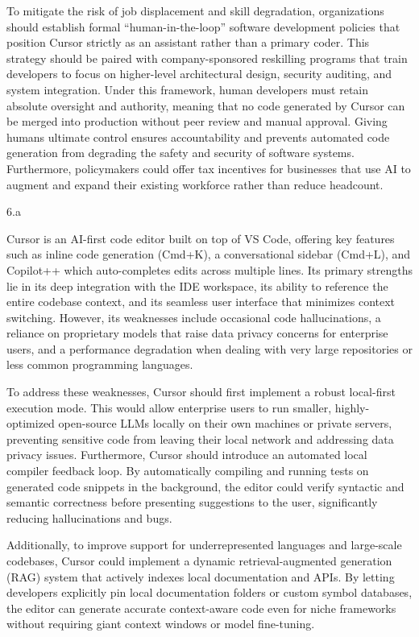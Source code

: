 \begin{answer}
  To mitigate the risk of job displacement and skill degradation, organizations should establish formal ``human-in-the-loop'' software development policies that position Cursor strictly as an assistant rather than a primary coder. This strategy should be paired with company-sponsored reskilling programs that train developers to focus on higher-level architectural design, security auditing, and system integration. Under this framework, human developers must retain absolute oversight and authority, meaning that no code generated by Cursor can be merged into production without peer review and manual approval. Giving humans ultimate control ensures accountability and prevents automated code generation from degrading the safety and security of software systems. Furthermore, policymakers could offer tax incentives for businesses that use AI to augment and expand their existing workforce rather than reduce headcount.
\end{answer}
\clearpage

\LARGE
6.a
\normalsize

\begin{answer}
  Cursor is an AI-first code editor built on top of VS Code, offering key features such as inline code generation (Cmd+K), a conversational sidebar (Cmd+L), and Copilot++ which auto-completes edits across multiple lines. Its primary strengths lie in its deep integration with the IDE workspace, its ability to reference the entire codebase context, and its seamless user interface that minimizes context switching. However, its weaknesses include occasional code hallucinations, a reliance on proprietary models that raise data privacy concerns for enterprise users, and a performance degradation when dealing with very large repositories or less common programming languages.

  To address these weaknesses, Cursor should first implement a robust local-first execution mode. This would allow enterprise users to run smaller, highly-optimized open-source LLMs locally on their own machines or private servers, preventing sensitive code from leaving their local network and addressing data privacy issues. Furthermore, Cursor should introduce an automated local compiler feedback loop. By automatically compiling and running tests on generated code snippets in the background, the editor could verify syntactic and semantic correctness before presenting suggestions to the user, significantly reducing hallucinations and bugs.

  Additionally, to improve support for underrepresented languages and large-scale codebases, Cursor could implement a dynamic retrieval-augmented generation (RAG) system that actively indexes local documentation and APIs. By letting developers explicitly pin local documentation folders or custom symbol databases, the editor can generate accurate context-aware code even for niche frameworks without requiring giant context windows or model fine-tuning.
\end{answer}

